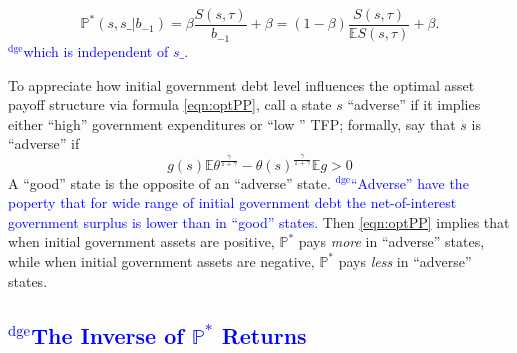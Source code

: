 \documentclass[12pt]{article}
\newcommand{\dge}[1]{\textcolor{blue}{$^{\textrm{dge}}${#1}}}
\newcommand{\EE}{\mathbb E}
\begin{document}
\begin{equation}\label{eqn:optPP}
 \mathbb{P}^*(s, s\_ |b_{-1}) = \beta\frac{S(s,\tau)}{b_{-1}} + \beta=(1-\beta)\frac{S(s,\tau)}{\EE S(s,\tau)} + \beta.
 \end{equation}\dge{which is independent of $s\_$.}

To appreciate how  initial government debt level influences the optimal asset payoff structure via formula \eqref{eqn:optPP}, call a
 state $s$ ``adverse''  if it implies either ``high'' government expenditures or ``low '' TFP; formally, say that  $s$ is ``adverse'' if
\[   g(s)\EE \theta^\frac{\gamma}{1+\gamma}-\theta(s)^\frac\gamma{1+\gamma}\EE g >0\]
A ``good'' state is the opposite of an ``adverse'' state.  \dge{``Adverse'' have the poperty that for  wide range of initial government debt the net-of-interest government surplus is lower than in ``good'' states.}  Then \eqref{eqn:optPP} implies that when initial government assets are positive, $\mathbb{P}^*$   pays {\em more} in ``adverse'' states, while when initial government assets are negative, $\mathbb{P}^*$  pays {\em less} in ``adverse'' states. 

%
%		
%	
%			

\subsection{\dge{The Inverse of $\mathbb P^*$ Returns}} %
\end{document}
